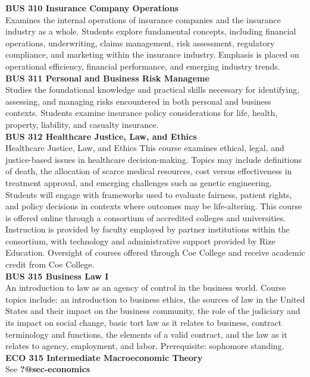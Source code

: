 \documentclass[
  letterpaper,
]{scrbook}
\begin{document}
\textbf{BUS 310 Insurance Company Operations}\\
Examines the internal operations of insurance companies and the
insurance industry as a whole. Students explore fundamental concepts,
including financial operations, underwriting, claims management, risk
assessment, regulatory compliance, and marketing within the insurance
industry. Emphasis is placed on operational efficiency, financial
performance, and emerging industry trends.\\
\textbf{BUS 311 Personal and Business Risk Manageme}\\
Studies the foundational knowledge and practical skills necessary for
identifying, assessing, and managing risks encountered in both personal
and business contexts. Students examine insurance policy considerations
for life, health, property, liability, and casualty insurance.\\
\textbf{BUS 312 Healthcare Justice, Law, and Ethics}\\
Healthcare Justice, Law, and Ethics This course examines ethical, legal,
and justice-based issues in healthcare decision-making. Topics may
include definitions of death, the allocation of scarce medical
resources, cost versus effectiveness in treatment approval, and emerging
challenges such as genetic engineering. Students will engage with
frameworks used to evaluate fairness, patient rights, and policy
decisions in contexts where outcomes may be life-altering. This course
is offered online through a consortium of accredited colleges and
universities. Instruction is provided by faculty employed by partner
institutions within the consortium, with technology and administrative
support provided by Rize Education. Oversight of courses offered through
Coe College and receive academic credit from Coe College.\\
\textbf{BUS 315 Business Law I}\\
An introduction to law as an agency of control in the business world.
Course topics include: an introduction to business ethics, the sources
of law in the United States and their impact on the business community,
the role of the judiciary and its impact on social change, basic tort
law as it relates to business, contract terminology and functions, the
elements of a valid contract, and the law as it relates to agency,
employment, and labor. Prerequisite: sophomore standing.\\
\textbf{ECO 315 Intermediate Macroeconomic Theory}\\
See \textbf{?@sec-economics}\\
\end{document}
